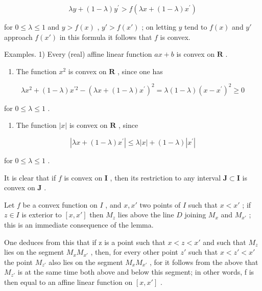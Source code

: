 \[
\lambda y + (1 - \lambda) y ^ {\prime} > f (\lambda x + (1 - \lambda) x ^ {\prime})
\]

for \(0 \leqslant \lambda \leqslant 1\) and \(y > f(x)\) , \(y' > f(x')\) ; on letting \(y\) tend to \(f(x)\) and \(y'\) approach \(f(x')\) in this formula it follows that \(f\) is convex.

Examples. 1) Every (real) affine linear function \(ax + b\) is convex on \(\mathbf{R}\) .

\begin{enumerate}
\def\labelenumi{\arabic{enumi})}
\setcounter{enumi}{1}
\tightlist
\item
  The function \(x^{2}\) is convex on \(\mathbf{R}\) , since one has
\end{enumerate}

\[
\lambda x ^ {2} + (1 - \lambda) x ^ {\prime 2} - \left(\lambda x + (1 - \lambda) x ^ {\prime}\right) ^ {2} = \lambda (1 - \lambda) (x - x ^ {\prime}) ^ {2} \geqslant 0
\]

for \(0 \leqslant \lambda \leqslant 1\) .

\begin{enumerate}
\def\labelenumi{\arabic{enumi})}
\setcounter{enumi}{2}
\tightlist
\item
  The function \(|x|\) is convex on \(\mathbf{R}\) , since
\end{enumerate}

\[
\left| \lambda x + (1 - \lambda) x ^ {\prime} \right| \leqslant \lambda | x | + (1 - \lambda) \left| x ^ {\prime} \right|
\]

for \(0 \leqslant \lambda \leqslant 1\) .

It is clear that if \(f\) is convex on \(\mathbf{I}\) , then its restriction to any interval \(\mathbf{J} \subset \mathbf{I}\) is convex on \(\mathbf{J}\) .

Let \(f\) be a convex function on \(I\) , and \(x, x'\) two points of \(I\) such that \(x < x'\) ; if \(z \in I\) is exterior to \([x, x']\) then \(M_z\) lies above the line \(D\) joining \(M_x\) and \(M_{x'}\) ; this is an immediate consequence of the lemma.

One deduces from this that if z is a point such that \(x < z < x'\) and such that \(M_{z}\) lies on the segment \(M_{x}M_{x'}\) , then, for every other point \(z'\) such that \(x < z' < x'\) the point \(M_{z'}\) also lies on the segment \(M_{x}M_{x'}\) , for it follows from the above that \(M_{z'}\) is at the same time both above and below this segment; in other words, f is then equal to an affine linear function on \([x, x']\) .


